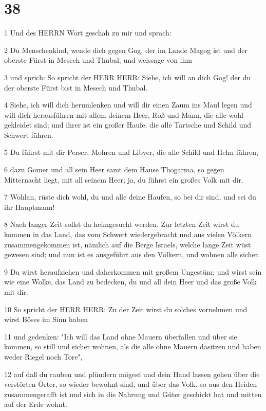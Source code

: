 \chapter{38}

\par 1 Und des HERRN Wort geschah zu mir und sprach:
\par 2 Du Menschenkind, wende dich gegen Gog, der im Lande Magog ist und der oberste Fürst in Mesech und Thubal, und weissage von ihm
\par 3 und sprich: So spricht der HERR HERR: Siehe, ich will an dich Gog! der du der oberste Fürst bist in Mesech und Thubal.
\par 4 Siehe, ich will dich herumlenken und will dir einen Zaum ins Maul legen und will dich herausführen mit allem deinem Heer, Roß und Mann, die alle wohl gekleidet sind; und ihrer ist ein großer Haufe, die alle Tartsche und Schild und Schwert führen.
\par 5 Du führst mit dir Perser, Mohren und Libyer, die alle Schild und Helm führen,
\par 6 dazu Gomer und all sein Heer samt dem Hause Thogarma, so gegen Mitternacht liegt, mit all seinem Heer; ja, du führst ein großes Volk mit dir.
\par 7 Wohlan, rüste dich wohl, du und alle deine Haufen, so bei dir sind, und sei du ihr Hauptmann!
\par 8 Nach langer Zeit sollst du heimgesucht werden. Zur letzten Zeit wirst du kommen in das Land, das vom Schwert wiedergebracht und aus vielen Völkern zusammengekommen ist, nämlich auf die Berge Israels, welche lange Zeit wüst gewesen sind; und nun ist es ausgeführt aus den Völkern, und wohnen alle sicher.
\par 9 Du wirst heraufziehen und daherkommen mit großem Ungestüm; und wirst sein wie eine Wolke, das Land zu bedecken, du und all dein Heer und das große Volk mit dir.
\par 10 So spricht der HERR HERR: Zu der Zeit wirst du solches vornehmen und wirst Böses im Sinn haben
\par 11 und gedenken: "Ich will das Land ohne Mauern überfallen und über sie kommen, so still und sicher wohnen, als die alle ohne Mauern dasitzen und haben weder Riegel noch Tore",
\par 12 auf daß du rauben und plündern mögest und dein Hand lassen gehen über die verstörten Örter, so wieder bewohnt sind, und über das Volk, so aus den Heiden zusammengerafft ist und sich in die Nahrung und Güter geschickt hat und mitten auf der Erde wohnt.

